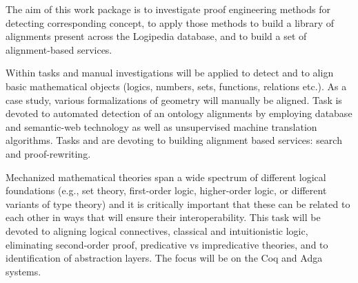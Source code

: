 \begin{workpackage}[id=alignment,type=RTD,wphases=1-48,
  short={Proof engineering},%
  title={Proof engineering},
  activity=jra,
  lead=Bel,
  LeeRM=12,  %
  StrRM=18,  %
  BelRM=18,  %
  ImtRM=6,  %
  InnRM=6,  %
  SacRM=6,  %
  FauRM=11, %
  BolRM=13, %
  InrRM=6   %
  ]

  \begin{wpobjectives}
    The aim of this work package is to investigate proof engineering
    methods for detecting corresponding concept, to apply those methods
    to build a library of alignments present across the Logipedia
    database, and to build a set of alignment-based services.
  \end{wpobjectives}

  \begin{wpdescription}
    Within tasks  and
     manual investigations will be
    applied to detect and to align basic mathematical objects (logics,
    numbers, sets, functions, relations etc.). As a case study,
    various formalizations of geometry will manually be aligned. Task
     is devoted to automated detection of
    an ontology alignments by employing database and semantic-web
    technology as well as unsupervised machine translation algorithms.
    Tasks  and 
    are devoting to building alignment based services: search and
    proof-rewriting.
  \end{wpdescription}

\begin{tasklist}
  \begin{task}[id=alignlogic,title=Logical foundations,shorttitle=Found.,lead=Lee,LeeRM=12,wphases=6-24!.67]
    Mechanized mathematical theories span a wide spectrum of different
    logical foundations (e.g., set theory, first-order logic,
    higher-order logic, or different variants of type theory) and it
    is critically important that these can be related to each other in
    ways that will ensure their interoperability. This task will be
    devoted to aligning logical connectives, classical and
    intuitionistic logic, eliminating second-order proof, predicative
    vs impredicative theories, and to identification of abstraction
    layers. The focus will be on the Coq and Adga systems.
  \end{task}
  

\end{tasklist}
\end{workpackage}

